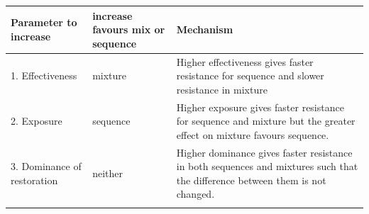 \documentclass[11pt,]{article}
\begin{document}
\begin{longtable}[]{@{}lll@{}}
\toprule
\begin{minipage}[b]{0.28\columnwidth}\raggedright\strut
Parameter to increase\strut
\end{minipage} & \begin{minipage}[b]{0.10\columnwidth}\raggedright\strut
increase favours mix or sequence\strut
\end{minipage} & \begin{minipage}[b]{0.53\columnwidth}\raggedright\strut
Mechanism\strut
\end{minipage}\tabularnewline
\midrule
\endhead
\begin{minipage}[t]{0.28\columnwidth}\raggedright\strut
1. Effectiveness\strut
\end{minipage} & \begin{minipage}[t]{0.10\columnwidth}\raggedright\strut
mixture\strut
\end{minipage} & \begin{minipage}[t]{0.53\columnwidth}\raggedright\strut
Higher effectiveness gives faster resistance for sequence and slower
resistance in mixture\strut
\end{minipage}\tabularnewline
\begin{minipage}[t]{0.28\columnwidth}\raggedright\strut
2. Exposure\strut
\end{minipage} & \begin{minipage}[t]{0.10\columnwidth}\raggedright\strut
sequence\strut
\end{minipage} & \begin{minipage}[t]{0.53\columnwidth}\raggedright\strut
Higher exposure gives faster resistance for sequence and mixture but the
greater effect on mixture favours sequence.\strut
\end{minipage}\tabularnewline
\begin{minipage}[t]{0.28\columnwidth}\raggedright\strut
3. Dominance of restoration\strut
\end{minipage} & \begin{minipage}[t]{0.10\columnwidth}\raggedright\strut
neither\strut
\end{minipage} & \begin{minipage}[t]{0.53\columnwidth}\raggedright\strut
Higher dominance gives faster resistance in both sequences and mixtures
such that the difference between them is not changed.\strut
\end{minipage}\tabularnewline
\begin{minipage}[t]{0.28\columnwidth}\raggedright\strut

\end{minipage}
\end{longtable}
\end{document}
